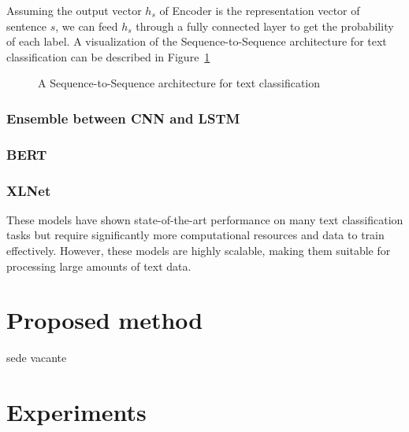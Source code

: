 \documentclass[pdflatex,sn-mathphys]{sn-jnl}%
\theoremstyle{thmstyleone}%
\theoremstyle{thmstyletwo}%
\theoremstyle{thmstylethree}%
\begin{document}
Assuming the output vector $h_s$ of Encoder is the representation vector of sentence $s$, we can feed $h_s$ through a fully connected layer to get the probability of each label. A visualization of the Sequence-to-Sequence architecture for text classification can be described in Figure~\ref{fig:seq2seq-classification}

\begin{figure}[htp]
\centering
{}
\caption{A Sequence-to-Sequence architecture for text classification}
\label{fig:seq2seq-classification}
\end{figure}

\subsubsection{Ensemble between CNN and LSTM}


\subsubsection{BERT}

\subsubsection{XLNet}

These models have shown state-of-the-art performance on many text classification tasks but require significantly more computational resources and data to train effectively. However, these models are highly scalable, making them suitable for processing large amounts of text data.


\section{Proposed method}\label{proposedmethod}
sede vacante

\section{Experiments}\label{experiments}
\end{document}
